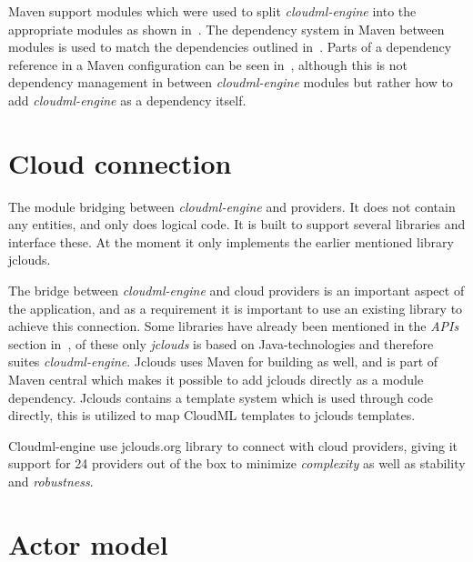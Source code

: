 




Maven support modules which were used to split \emph{cloudml-engine} into the appropriate 
modules as shown in~. 
The dependency system in Maven between modules is used to match the dependencies outlined in~.
Parts of a dependency reference in a Maven configuration can be seen in~,
although this is not dependency management in between \emph{cloudml-engine} modules but rather
how to add \emph{cloudml-engine} as a dependency itself.

\section{Cloud connection}

The module bridging between \emph{cloudml-engine} and providers.
It does not contain any entities, and only does logical code. 
It is built to support several libraries and interface these. At the moment it only implements the earlier
mentioned library jclouds.

The bridge between \emph{cloudml-engine} and cloud providers is an important aspect of the application, 
and as a requirement it is important to use an existing library to achieve this connection.
Some libraries have already been mentioned in the \emph{APIs} section in~,
of these only \emph{jclouds} is based on Java-technologies and therefore suites \emph{cloudml-engine}.
Jclouds uses Maven for building as well, and is part of Maven central which makes 
it possible to add jclouds directly as a module dependency.
Jclouds contains a template system which is used through code directly, this is utilized 
to map CloudML templates to jclouds templates.

\hr

Cloudml-engine use jclouds.org library to connect with cloud providers, giving it support
for 24 providers out of the box to minimize \emph{complexity} as well as stability and \emph{robustness}.

\section{Actor model}


